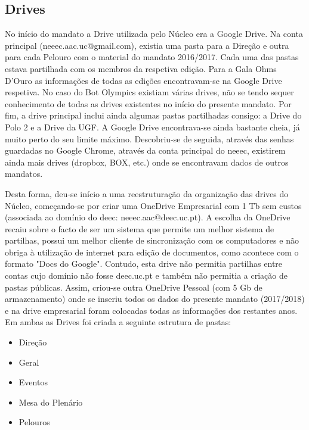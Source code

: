 
\subsection{Drives}

No início do mandato a Drive utilizada pelo Núcleo era a Google Drive. Na conta principal (neeec.aac.uc@gmail.com), existia uma pasta para a Direção e outra para cada Pelouro com o material do mandato 2016/2017. Cada uma das pastas estava partilhada com os membros da respetiva edição. Para a Gala Ohms D'Ouro as informações de todas as edições encontravam-se na Google Drive respetiva. No caso do Bot Olympics existiam várias drives, não se tendo sequer conhecimento de todas as drives existentes no início do presente mandato. Por fim, a drive principal inclui ainda algumas pastas partilhadas consigo: a Drive do Polo 2 e a Drive da UGF. A Google Drive encontrava-se ainda bastante cheia, já muito perto do seu limite máximo. Descobriu-se de seguida, através das senhas guardadas no Google Chrome, através da conta principal do \acrshort{neeec}, existirem ainda mais drives (dropbox, BOX, etc.) onde se encontravam dados de outros mandatos.

Desta forma, deu-se início a uma reestruturação da organização das drives do Núcleo, começando-se por criar uma OneDrive Empresarial com 1 Tb sem custos (associada ao domínio do \acrshort{deec}: neeec.aac@deec.uc.pt). A escolha da OneDrive recaiu sobre o facto de ser um sistema que permite um melhor sistema de partilhas, possui um melhor cliente de sincronização com os computadores e não obriga à utilização de internet para edição de documentos, como acontece com o formato "Docs do Google". Contudo, esta drive não permitia partilhas entre contas cujo domínio não fosse deec.uc.pt e também não permitia a criação de pastas públicas. Assim, criou-se outra OneDrive Pessoal (com 5 Gb de armazenamento) onde se inseriu todos os dados do presente mandato (2017/2018) e na drive empresarial foram colocadas todas as informações dos restantes anos. Em ambas as Drives foi criada a seguinte estrutura de pastas:
\begin{itemize}
\item Direção
\item Geral
\item Eventos
\item Mesa do Plenário
\item Pelouros
\end{itemize}

